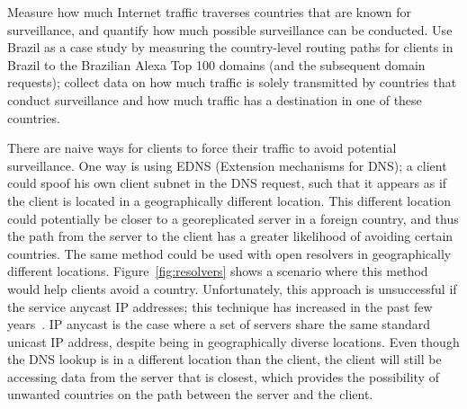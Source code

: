 \begin{thm}
Measure how much Internet traffic traverses countries that are known for surveillance, and quantify how much possible surveillance can be conducted.  Use Brazil as a case study by measuring the country-level routing paths for clients in Brazil to the Brazilian Alexa Top 100 domains (and the subsequent domain requests); collect data on how much traffic is solely transmitted by countries that conduct surveillance and how much traffic has a destination in one of these countries.
\end{thm}

There are naive ways for clients to force their traffic to avoid potential surveillance.  One way is using EDNS (Extension mechanisms for DNS); a client could spoof his own client subnet in the DNS request, such that it appears as if the client is located in a geographically different location.  This different location could potentially be closer to a georeplicated server in a foreign country, and thus the path from the server to the client has a greater likelihood of avoiding certain countries.  The same method could be used with open resolvers in geographically different locations.  Figure~\ref{fig:resolvers} shows a scenario where this method would help clients avoid a country.    Unfortunately, this approach is unsuccessful if the service anycast IP addresses; this technique has increased in the past few years~\cite{cicalese2015characterizing}.  IP anycast is the case where a set of servers share the same standard unicast IP address, despite being in geographically diverse locations.  Even though the DNS lookup is in a different location than the client, the client will still be accessing data from the server that is closest, which provides the possibility of unwanted countries on the path between the server and the client.  

